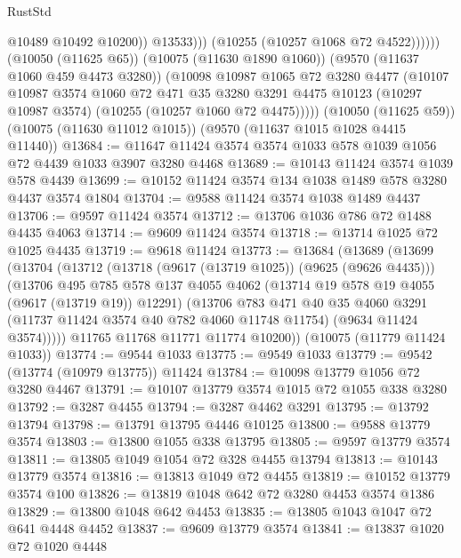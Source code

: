 \begin{lexlean}{RustStd}
\begin{coremodule}
                        @10489
                        @10492
                        @10200))
                    @13533)))
              (@10255 (@10257 @1068 @72 @4522))))))
      (@10050 (@11625 @65))
      (@10075 (@11630 @1890 @1060))
      (@9570 (@11637 @1060 @459 @4473 @3280))
      (@10098
        @10987
        @1065
        @72
        @3280
        @4477
        (@10107
          @10987
          @3574
          @1060
          @72
          @471
          @35
          @3280
          @3291
          @4475
          @10123
          (@10297 @10987 @3574)
          (@10255 (@10257 @1060 @72 @4475)))))
    (@10050 (@11625 @59))
    (@10075 (@11630 @11012 @1015))
    (@9570 (@11637 @1015 @1028 @4415 @11440))
@13684 := @11647 @11424 @3574 @3574 @1033 @578 @1039 @1056 @72 @4439 @1033 @3907 @3280 @4468
@13689 := @10143 @11424 @3574 @1039 @578 @4439
@13699 := @10152 @11424 @3574 @134 @1038 @1489 @578 @3280 @4437 @3574 @1804
@13704 := @9588 @11424 @3574 @1038 @1489 @4437
@13706 := @9597 @11424 @3574
@13712 := @13706 @1036 @786 @72 @1488 @4435 @4063
@13714 := @9609 @11424 @3574
@13718 := @13714 @1025 @72 @1025 @4435
@13719 := @9618 @11424
@13773 := @13684
    (@13689
      (@13699
        (@13704
          (@13712
            (@13718 (@9617 (@13719 @1025)) (@9625 (@9626 @4435)))
            (@13706
              @495
              @785
              @578
              @137
              @4055
              @4062
              (@13714 @19 @578 @19 @4055 (@9617 (@13719 @19)) @12291)
              (@13706
                @783
                @471
                @40
                @35
                @4060
                @3291
                (@11737 @11424 @3574 @40 @782 @4060 @11748 @11754)
                (@9634 @11424 @3574)))))
        @11765
        @11768
        @11771
        @11774
        @10200))
    (@10075 (@11779 @11424 @1033))
@13774 := @9544 @1033
@13775 := @9549 @1033
@13779 := @9542 (@13774 (@10979 @13775)) @11424
@13784 := @10098 @13779 @1056 @72 @3280 @4467
@13791 := @10107 @13779 @3574 @1015 @72 @1055 @338 @3280
@13792 := @3287 @4455
@13794 := @3287 @4462 @3291
@13795 := @13792 @13794
@13798 := @13791 @13795 @4446 @10125
@13800 := @9588 @13779 @3574
@13803 := @13800 @1055 @338 @13795
@13805 := @9597 @13779 @3574
@13811 := @13805 @1049 @1054 @72 @328 @4455 @13794
@13813 := @10143 @13779 @3574
@13816 := @13813 @1049 @72 @4455
@13819 := @10152 @13779 @3574 @100
@13826 := @13819 @1048 @642 @72 @3280 @4453 @3574 @1386
@13829 := @13800 @1048 @642 @4453
@13835 := @13805 @1043 @1047 @72 @641 @4448 @4452
@13837 := @9609 @13779 @3574
@13841 := @13837 @1020 @72 @1020 @4448

\end{coremodule}
\end{lexlean}
